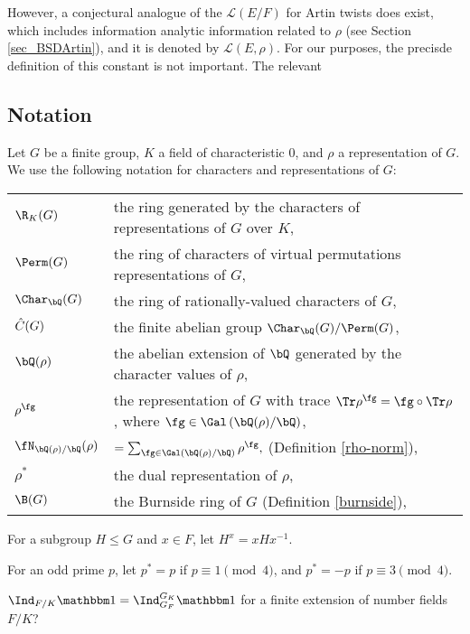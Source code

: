 However, a conjectural analogue of the $\mathcal{L}(E/F)$ for Artin twists does exist, which includes information analytic information related to $\rho$ (see Section \ref{sec_BSDArtin}), and it is denoted by $\mathcal{L}(E,\rho)$. For our purposes, the precisde definition of this constant is not important. The relevant 


\newpage
\subsection*{Notation}
Let $G$ be a finite group, $K$ a field of characteristic $0$, and $\rho$ a representation of $G$. We use the following notation for characters and representations of $G$:

\bigskip

\begin{tabular}{l | l}
     $\R_{K}(G)$ & the ring generated by the characters of representations of $G$ over $K$,\\
    $\Perm(G)$ & the ring of characters of virtual permutations representations of $G$, \\
    $\Char_{\bQ}(G)$ & the ring of rationally-valued characters of $G$,\\ 
    $\hat{C}(G)$ & the finite abelian group $\Char_{\bQ}(G) / \Perm(G)$, \\ 
    $\bQ(\rho)$ & the abelian extension of $\bQ$ generated by the character values of $\rho$, \\
    $\rho^{\fg}$ & the representation of $G$ with trace $\Tr \rho^{\fg} = \fg \circ \Tr \rho$, where $\fg \in \Gal\left(\bQ(\rho) / \bQ\right)$,\\
    $\repnorm{\rho}$ &  $ = \sum_{\fg \in \Gal(\bQ(\rho) / \bQ)} \rho^{\fg},$ (Definition \ref{rho-norm}),\\
    $\rho^*$ & the dual representation of $\rho$,
    \\
    $\B(G)$ & the Burnside ring of $G$ (Definition \ref{burnside}), \\
\end{tabular}
\vspace{1em}

For a subgroup $H \leq G$ and $x \in F$, let $H^{x} = x H x^{-1}$.  

For an odd prime $p$, let $p^* = p$ if $p \equiv 1 \pmod 4$, and $p^* = -p$ if $p \equiv 3 \pmod 4$. 

$\Ind_{F / K} \trivial  = \Ind_{G_F}^{G_K} \trivial$ for a finite extension of number fields $F / K$?